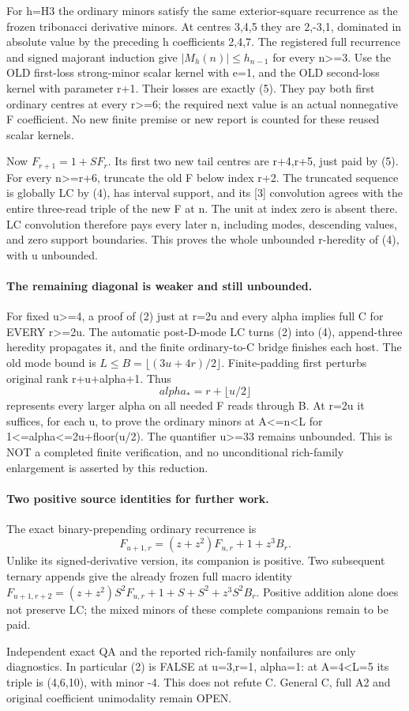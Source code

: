 For h=H3 the ordinary minors satisfy the same exterior-square
recurrence as the frozen tribonacci derivative minors. At centres
3,4,5 they are 2,-3,1, dominated in absolute value by the preceding
h coefficients 2,4,7. The registered full recurrence and signed
majorant induction give $|M_h(n)|\le h_{n-1}$ for every n>=3.
Use the OLD first-loss strong-minor scalar kernel with e=1, and
the OLD second-loss kernel with parameter r+1. Their losses are
exactly (5). They pay both first ordinary centres at every r>=6;
the required next value is an actual nonnegative F coefficient.
No new finite premise or new report is counted for these reused
scalar kernels.

Now $F_{r+1}=1+S F_r$. Its first two new tail centres are r+4,r+5,
just paid by (5). For every n>=r+6, truncate the old F below index
r+2. The truncated sequence is globally LC by (4), has interval
support, and its [3] convolution agrees with the entire three-read
triple of the new F at n. The unit at index zero is absent there.
LC convolution therefore pays every later n, including modes,
descending values, and zero support boundaries. This proves the
whole unbounded r-heredity of (4), with u unbounded.

\paragraph{The remaining diagonal is weaker and still unbounded.}
For fixed u>=4, a proof of (2) just at r=2u and every alpha implies
full C for EVERY r>=2u. The automatic post-D-mode LC turns (2)
into (4), append-three heredity propagates it, and the finite
ordinary-to-C bridge finishes each host.
The old mode bound is $L\le B=\lfloor(3u+4r)/2\rfloor$.
Finite-padding first perturbs original rank r+u+alpha+1. Thus
\[
             alpha_*=r+\lfloor u/2\rfloor
\]
represents every larger alpha on all needed F reads through B.
At r=2u it suffices, for each u, to prove the ordinary minors
at A<=n<L for 1<=alpha<=2u+floor(u/2).
The quantifier u>=33 remains unbounded. This is NOT a completed
finite verification, and no unconditional rich-family enlargement
is asserted by this reduction.

\paragraph{Two positive source identities for further work.}
The exact binary-prepending ordinary recurrence is
\[
 F_{u+1,r}=(z+z^2)F_{u,r}+1+z^3B_r.
\]
Unlike its signed-derivative version, its companion is positive.
Two subsequent ternary appends give the already frozen full macro
identity $F_{u+1,r+2}=(z+z^2)S^2F_{u,r}+1+S+S^2+z^3S^2B_r$.
Positive addition alone does not preserve LC; the mixed minors
of these complete companions remain to be paid.

Independent exact QA and the reported rich-family nonfailures
are only diagnostics. In particular (2) is FALSE at u=3,r=1,
alpha=1: at A=4<L=5 its triple is (4,6,10), with minor -4.
This does not refute C. General C, full A2 and original coefficient
unimodality remain OPEN.
